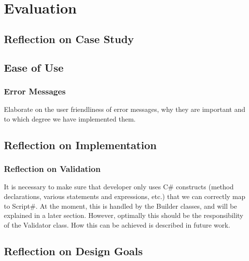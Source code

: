 \chapter{Evaluation}

\section{Reflection on Case Study} %
\label{sec:reflection_on_case_study}


\section{Ease of Use} %
\label{sec:ease_of_use}

	\subsection{Error Messages} %
	\label{sub:error_messages}
		Elaborate on the user friendliness of error messages, why they are important
		and to which degree we have implemented them.	


\section{Reflection on Implementation} %
\label{sec:reflection_on_implementation}
\subsection{Reflection on Validation} %
\label{sub:reflection_on_validation}
It is necessary to make sure that developer only uses C\# constructs (method declarations, various statements and expressions, etc.) that we can correctly map to Script\#. At the moment, this is handled by the Builder classes, and will be explained in a later section. However, optimally this should be the responsibility of the Validator class. How this can be achieved is described in future work.

\section{Reflection on Design Goals} %
\label{sec:reflection_on_design_goals}

